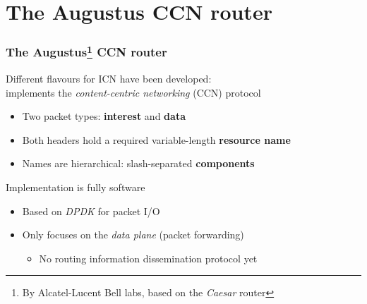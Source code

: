 \section{The Augustus CCN router}

\begin{frame}[fragile]
  \frametitle{The Augustus\footnote{By Alcatel-Lucent Bell labs, based on the \textit{Caesar} \cite{caesar} router} CCN router}
  Different flavours for ICN have been developed:\\
  implements the \emph{content-centric networking} (CCN) protocol
  \begin{itemize}
    \item Two packet types: \textbf{interest} and \textbf{data} \cite{icn-packet}
    \item Both headers hold a required variable-length \textbf{resource name}
    \item Names are hierarchical: slash-separated \textbf{components}
  \end{itemize}
  Implementation is fully software
  \begin{itemize}
    \item Based on \emph{DPDK} for packet I/O \cite{dpdk}
    \item Only focuses on the \emph{data plane} (packet forwarding)
      \begin{itemize}
        \item No routing information dissemination protocol yet
      \end{itemize}
  \end{itemize}
\end{frame}

